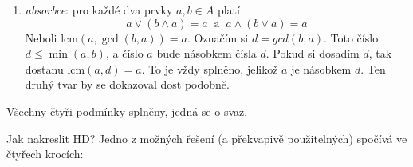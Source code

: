 \documentclass{article}
\newtheorem{veta}{Věta}[section]
\begin{document}
\begin{enumerate}
\begin{enumerate}
Co dělám je, že hledám maximální koeficienty u prvočísel - a je úplně jedno, jestli to udělám nejdřív pro 1. a 2. číslo, a pak k tomu najdu 3., nebo v jiném pořadí. Je to i úplně stejný postup, jako bych dělal lcm(a,b,c).  Pro \emph{gcd} to udělám \textsl{Hard-Way}\textcopyright:

\begin{veta}
Binární operace \emph{gcd} je asociativní, tj. pro libovolná přirozená čísla $a,b,c$ platí
\[ \gcd(\gcd(a, b), c) = \gcd(a, \gcd(b, c)). \]
\end{veta}
\begin{proof}
Položím $d = gcd(gcd(a, b), c)$. Co to znamená? To znamená, že (1) $d$ dělí $\gcd(a,b)$ a $c$ a (2) jestliže $d'$ je nějaké jiné přirozené číslo, $d' \neq d$, které dělí beze zbytku $\gcd(a, b)$ a $c$, pak nutně $d > d'$. K tomu, abych dokázal asociativitu $\gcd$, musím dokázat, že (1) $d$ dělí $a$ a $\gcd(b,c)$ a (2) jestliže $d'$ je nějaké jiné přirozené číslo, které dělí $a$ a $\gcd(b, c)$, potom $d>d'$.  
 
\begin{enumerate}
\renewcommand{\labelenumiii}{(\arabic{enumiii})}
\item Jelikož $d$ dělí $\gcd(a, b)$, $d$ musí dělit $a$ a $b$. Vím, že $d$ dělí $c$, tedy $d$ musí dělit i $\gcd(b, c)$. 
\item Předpokládám, že $d'$ dělí $a$ a $\gcd(b, c)$. Potom $d'$ dělí $b$ a $c$, takže $d'$ musí dělit i $\gcd(a, b)$. Tedy, podle předpokladu, $d>d'$.
\end{enumerate}
\end{proof}

\item \emph{absorbce}: pro každé dva prvky $a,b \in A$ platí
 \[ a \vee (b \wedge a) = a \ \mbox{ a }\  a \wedge (b \vee a) = a \]
Neboli $\mbox{lcm}(a,\gcd(b,a)) = a$. Označím si $d = gcd(b,a)$. Toto číslo $d \leq \min(a,b)$, a číslo $a$ bude násobkem čísla $d$. Pokud si dosadím $d$, tak dostanu $\mbox{lcm}(a,d) = a$. To je vždy splněno, jelikož $a$ je násobkem $d$.
Ten druhý tvar by se dokazoval dost podobně. 
\end{enumerate}

Všechny čtyři podmínky splněny, jedná se o svaz.

Jak nakreslit HD? Jedno z možných řešení (a překvapivě použitelných) spočívá ve čtyřech krocích:

\renewcommand{\labelenumi}{\arabic{enumi}.}


\end{enumerate}
\end{document}
